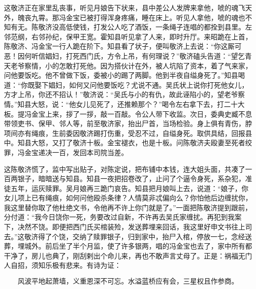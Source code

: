 这敬济正在家里乱丧事，听见月娘告下状来，县中差公人发牌来拿他，唬的魂飞天外，魄丧九霄。那冯金宝已被打得浑身疼痛，睡在床上。听见人拿他，唬的魂也不知有无。陈敬济没高低使钱，打发公人吃了酒饭，一条绳子连唱的都拴到县里。左邻范纲，右邻孙纪，保甲王宽。霍知县听见拿了人来，即时升厅。来昭跪在上首，陈敬济、冯金宝一行人跪在阶下。知县看了状子，便叫敬济上去说：“你这厮可恶！因何听信娼妇，打死西门氏，方令上吊，有何理说？”敬济磕头告道：“望乞青天老爷察情，小的怎敢打死他。因为搭伙计在外，被人坑陷了资本，着了气来家，问他要饭吃。他不曾做下饭，委被小的踢了两脚。他到半夜自缢身死了。”知县喝道：“你既娶下娼妇，如何又问他要饭吃？尤说不通。吴氏状上说你打死他女儿，方才上吊，你还不招认！”敬济说：“吴氏与小的有仇，故此诬陷小的，望老爷察情。”知县大怒，说：“他女儿见死了，还推赖那个？”喝令左右拿下去，打二十大板。提冯金宝上来，拶了一拶，敲一百敲。令公人带下收监。次日，委典史臧不息带领吏书、保甲、邻人等，前至敬济家，抬出尸首，当场检验。身上俱有青伤，脖项间亦有绳痕，生前委因敬济踢打伤重，受忍不过，自缢身死。取供具结，回报县中。知县大怒，又打了敬济十板。金宝褪衣，也是十板。问陈敬济夫殴妻至死者绞罪，冯金宝递决一百，发回本司院当差。

这陈敬济慌了，监中写出贴子，对陈定说，把布铺中本钱，连大姐头面，共凑了一百两银子，暗暗送与知县。知县一夜把招卷改了，止问了个逼令身死，系杂犯，准徒五年，运灰赎罪。吴月娘再三跪门哀告。知县把月娘叫上去，说道：“娘子，你女儿项上已有绳痕，如何问他殴杀条律？人情莫非忒偏向么？你怕他后边缠扰你，我这里替你取了他杜绝文书，令他再不许上你门就是了。”一面把陈敬济提到跟前，分付道：“我今日饶你一死，务要改过自新，不许再去吴氏家缠扰。再犯到我案下，决然不饶。即便把西门氏买棺装殓，发送葬埋来回话，我这里好申文书往上司去。”这敬济得了个饶，交纳了赎罪银子，归到家中，抬尸入棺，停放一七，念经送葬，埋城外。前后坐了半个月监，使了许多银两，唱的冯金宝也去了，家中所有都干净了，房儿也典了，刚刮剌出个命儿来，再也不敢声言丈母了。正是：祸福无门人自招，须知乐极有悲来。有诗为证：

\[
风波平地起萧墙，义重恩深不可忘。
水溢蓝桥应有会，三星权且作参商。
\]
